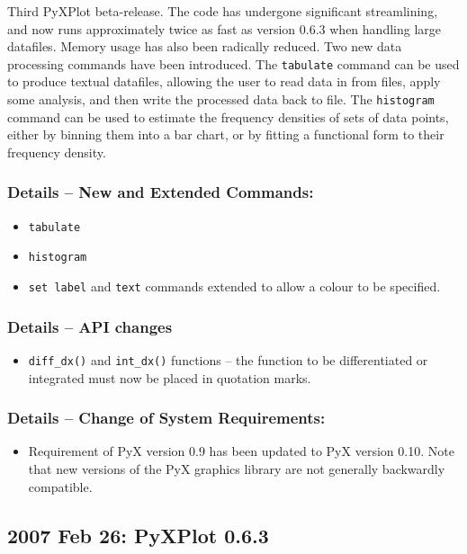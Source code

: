 Third PyXPlot beta-release. The code has undergone significant streamlining,
and now runs approximately twice as fast as version 0.6.3 when handling large
datafiles. Memory usage has also been radically reduced. Two new data
processing commands have been introduced. The {\tt tabulate} command can be
used to produce textual datafiles, allowing the user to read data in from
files, apply some analysis, and then write the processed data back to file. The
{\tt histogram} command can be used to estimate the frequency densities of sets
of data points, either by binning them into a bar chart, or by fitting a
functional form to their frequency density.

\subsubsection*{Details -- New and Extended Commands:}

\begin{itemize}
\item {\tt tabulate}
\item {\tt histogram}
\item {\tt set label} and {\tt text} commands extended to allow a colour to be
specified.
\end{itemize}

\subsubsection*{Details -- API changes}

\begin{itemize}
\item {\tt diff\_dx()} and {\tt int\_dx()} functions -- the function to be
differentiated or integrated must now be placed in quotation marks.
\end{itemize}

\subsubsection*{Details -- Change of System Requirements:}

\begin{itemize}
\item Requirement of PyX version 0.9 has been updated to PyX version 0.10. Note that new versions of the PyX graphics library are not generally backwardly compatible.
\end{itemize}

\subsection*{2007 Feb 26: PyXPlot 0.6.3}

